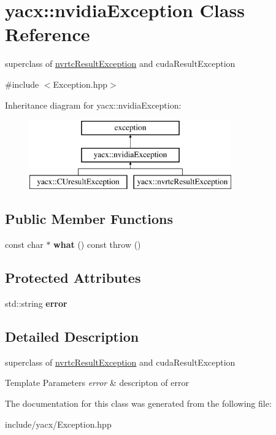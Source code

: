 \hypertarget{classyacx_1_1nvidia_exception}{}\section{yacx\+:\+:nvidia\+Exception Class Reference}
\label{classyacx_1_1nvidia_exception}


superclass of \hyperlink{classyacx_1_1nvrtc_result_exception}{nvrtc\+Result\+Exception} and cuda\+Result\+Exception  




{\ttfamily \#include $<$Exception.\+hpp$>$}

Inheritance diagram for yacx\+:\+:nvidia\+Exception\+:\begin{figure}[H]
\begin{center}
\leavevmode
\includegraphics[height=3.000000cm]{classyacx_1_1nvidia_exception}
\end{center}
\end{figure}
\subsection*{Public Member Functions}
\begin{DoxyCompactItemize}
\item 
\mbox{\label{classyacx_1_1nvidia_exception_a7fc190c89e3aaac0e5da617fdaf96952}} 
const char $\ast$ {\bfseries what} () const  throw ()
\end{DoxyCompactItemize}
\subsection*{Protected Attributes}
\begin{DoxyCompactItemize}
\item 
\mbox{\label{classyacx_1_1nvidia_exception_a41db782b93c6999a0fd4e6a3b438ae59}} 
std\+::string {\bfseries error}
\end{DoxyCompactItemize}


\subsection{Detailed Description}
superclass of \hyperlink{classyacx_1_1nvrtc_result_exception}{nvrtc\+Result\+Exception} and cuda\+Result\+Exception 


\begin{DoxyTemplParams}{Template Parameters}
{\em error} & descripton of error \\
\hline
\end{DoxyTemplParams}


The documentation for this class was generated from the following file\+:\begin{DoxyCompactItemize}
\item 
include/yacx/Exception.\+hpp\end{DoxyCompactItemize}
